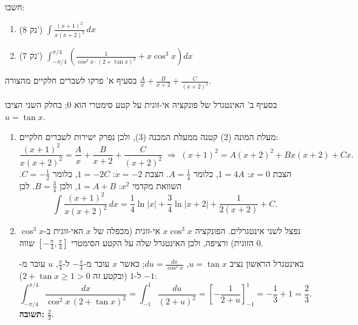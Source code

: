 
\begin{question}
חשבו:
\begin{enumerate}
  \item[א.] (8 נק') $\displaystyle\int\frac{(x+1)^2}{x(x+2)^2}\,dx$
  \item[ב.] (7 נק') $\displaystyle\int_{-\pi/4}^{\pi/4}\left(\frac{1}{\cos^2x\cdot(2+\tan x)^2}+x\cos^3x\right)dx$
\end{enumerate}
\end{question}

\begin{hint}
בסעיף א' פרקו לשברים חלקיים מהצורה $\frac{A}{x}+\frac{B}{x+2}+\frac{C}{(x+2)^2}$.
\end{hint}

\begin{hint}
בסעיף ב' האינטגרל של פונקציה אי-זוגית על קטע סימטרי הוא $0$; בחלק השני הציבו $u=\tan x$.
\end{hint}

\begin{solution}
\begin{enumerate}
  \item[א.] מעלת המונה (2) קטנה ממעלת המכנה (3), ולכן נפרק ישירות לשברים חלקיים:
  \[ \frac{(x+1)^2}{x(x+2)^2}=\frac{A}{x}+\frac{B}{x+2}+\frac{C}{(x+2)^2}
  \;\Longrightarrow\; (x+1)^2=A(x+2)^2+Bx(x+2)+Cx. \]
  הצבת $x=0$: $1=4A$, כלומר $A=\frac14$. הצבת $x=-2$: $1=-2C$, כלומר $C=-\frac12$. השוואת מקדמי $x^2$: $1=A+B$, ולכן $B=\frac34$. לכן
  \[ \int\frac{(x+1)^2}{x(x+2)^2}\,dx=\frac14\ln|x|+\frac34\ln|x+2|+\frac{1}{2(x+2)}+C. \]
  \item[ב.] נפצל לשני אינטגרלים. הפונקציה $x\cos^3x$ אי-זוגית (מכפלה של $x$ האי-זוגית ב-$\cos^3x$ הזוגית) ורציפה, ולכן האינטגרל שלה על הקטע הסימטרי $[-\frac\pi4,\frac\pi4]$ שווה $0$.

  באינטגרל הראשון נציב $u=\tan x$, $du=\frac{dx}{\cos^2x}$; כאשר $x$ עובר מ-$-\frac\pi4$ ל-$\frac\pi4$, $u$ עובר מ-$-1$ ל-$1$ (ובקטע זה $2+\tan x\ge1>0$):
  \[ \int_{-\pi/4}^{\pi/4}\frac{dx}{\cos^2x\,(2+\tan x)^2}=\int_{-1}^{1}\frac{du}{(2+u)^2}=\left[-\frac{1}{2+u}\right]_{-1}^{1}=-\frac13+1=\frac23. \]
  \textbf{תשובה:} $\frac23$.
\end{enumerate}
\end{solution}
